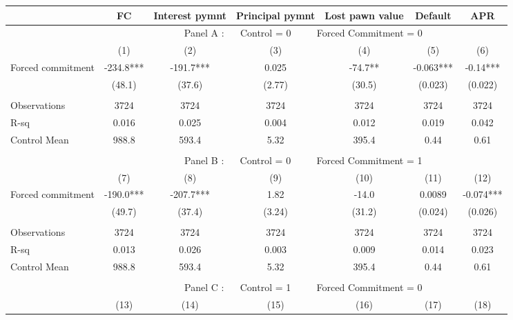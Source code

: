 \begin{tabular}{lcccccc}
\toprule
      & FC    & Interest pymnt & Principal pymnt & Lost pawn value & Default & APR \\
\midrule
      & \multicolumn{6}{c}{Panel A : $\quad$ Control  = 0           $\quad\quad$                  Forced Commitment = 0} \\
\midrule
\midrule
      & (1)   & (2)   & (3)   & (4)   & (5)   & (6) \\
\midrule
\midrule
Forced commitment  & -234.8*** & -191.7*** & 0.025 & -74.7** & -0.063*** & -0.14*** \\
      & (48.1) & (37.6) & (2.77) & (30.5) & (0.023) & (0.022) \\
      &       &       &       &       &       &  \\
\midrule
Observations & 3724  & 3724  & 3724  & 3724  & 3724  & 3724 \\
R-sq  & 0.016 & 0.025 & 0.004 & 0.012 & 0.019 & 0.042 \\
Control Mean & 988.8 & 593.4 & 5.32  & 395.4 & 0.44  & 0.61 \\
\midrule
\midrule
      &       &       &       &       &       &  \\
\midrule
      & \multicolumn{6}{c}{Panel B : $\quad$ Control  = 0         $\quad\quad$                    Forced Commitment = 1} \\
\midrule
\midrule
      & (7)   & (8)   & (9)   & (10)  & (11)  & (12) \\
\midrule
\midrule
Forced commitment  & -190.0*** & -207.7*** & 1.82  & -14.0 & 0.0089 & -0.074*** \\
      & (49.7) & (37.4) & (3.24) & (31.2) & (0.024) & (0.026) \\
      &       &       &       &       &       &  \\
\midrule
Observations & 3724  & 3724  & 3724  & 3724  & 3724  & 3724 \\
R-sq  & 0.013 & 0.026 & 0.003 & 0.009 & 0.014 & 0.023 \\
Control Mean & 988.8 & 593.4 & 5.32  & 395.4 & 0.44  & 0.61 \\
\midrule
\midrule
      &       &       &       &       &       &  \\
\midrule
      & \multicolumn{6}{c}{Panel C : $\quad$ Control  = 1        $\quad\quad$                     Forced Commitment = 0} \\
\midrule
\midrule
      & (13)  & (14)  & (15)  & (16)  & (17)  & (18) \\

\end{tabular}
